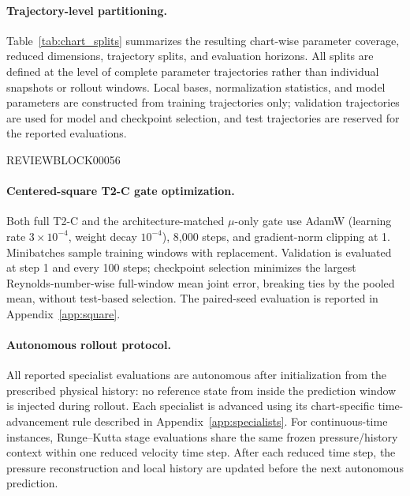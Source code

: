 \documentclass{article}
\begin{document}
\paragraph{Trajectory-level partitioning.}
Table~\ref{tab:chart_splits} summarizes the resulting chart-wise parameter coverage, reduced dimensions, trajectory splits, and evaluation horizons. All splits are defined at the level of complete parameter trajectories rather than individual snapshots or rollout windows. Local bases, normalization statistics, and model parameters are constructed from training trajectories only; validation trajectories are used for model and checkpoint selection, and test trajectories are reserved for the reported evaluations. 

\par


REVIEWBLOCK00056


\par


\paragraph{Centered-square T2-C gate optimization.}
Both full T2-C and the architecture-matched $\mu$-only gate use AdamW
(learning rate $3\times10^{-4}$, weight decay $10^{-4}$), 8,000 steps,
and gradient-norm clipping at 1. Minibatches sample training windows with
replacement. Validation is evaluated at step 1 and every 100 steps;
checkpoint selection minimizes the largest Reynolds-number-wise full-window mean joint
error, breaking ties by the pooled mean, without test-based selection.
The paired-seed evaluation is reported in Appendix~\ref{app:square}.



\paragraph{Autonomous rollout protocol.}
All reported specialist evaluations are autonomous after initialization from the prescribed physical history: no reference state from inside the prediction window is injected during rollout.
Each specialist is advanced using its chart-specific time-advancement rule described in Appendix~\ref{app:specialists}. For continuous-time instances, Runge--Kutta stage evaluations share the same frozen pressure/history context within one reduced velocity time step. After each reduced time step, the pressure reconstruction and local history are updated before the next autonomous prediction.
\end{document}
